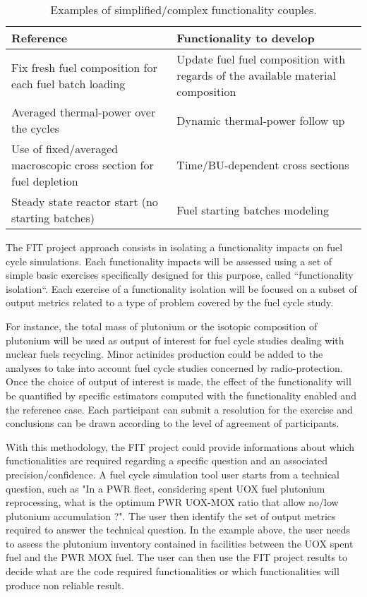 \begin{table}[h]
\centering
\begin{tabular}{ |p{}|p{}| }
  \hline
  Reference & Functionality to develop 
  \\ \hline
  Fix fresh fuel composition for each fuel batch loading 
  & Update fuel fuel composition with regards of the available material
  composition 
  \\ \hline
  Averaged thermal-power over the cycles 
  & Dynamic thermal-power follow up
  \\ \hline
  Use of fixed/averaged macroscopic cross section for fuel depletion
  & Time/\gls{BU}-dependent cross sections
  \\ \hline
  Steady state reactor start (no starting batches)
  & Fuel starting batches modeling \\
  \hline
\end{tabular}
\label{Tab:Funct}
\caption{Examples of simplified/complex functionality couples.}
\end{table}


The FIT project approach consists in isolating a functionality impacts on fuel
cycle simulations. Each functionality impacts will be assessed using a set of
simple basic exercises specifically designed for this purpose, called
``functionality isolation``. Each exercise of a functionality isolation will be
focused on a subset of output metrics related to a type of problem covered by
the fuel cycle study.  

For instance, the total mass of plutonium or the isotopic composition of
plutonium will be used as output of interest for fuel cycle studies dealing with 
nuclear fuels recycling. Minor actinides production could be added to the
analyses to take into account fuel cycle studies concerned by radio-protection.
Once the choice of output of interest is made, the effect of the functionality
will be quantified by specific estimators computed with the functionality
enabled and the reference case. Each participant can submit a resolution for the
exercise and conclusions can be drawn according to the level of agreement
of participants.

With this methodology, the FIT project could provide informations about which
functionalities are required regarding a specific question and an associated
precision/confidence.  A fuel cycle simulation tool user starts from a technical
question, such as "In a \gls{PWR} fleet, considering spent \gls{UOX} fuel plutonium
reprocessing, what is the optimum \gls{PWR} \gls{UOX}-\gls{MOX} ratio that allow no/low plutonium
accumulation ?". The user then identify the set of output metrics required to
answer the technical question. In the example above, the user needs to assess
the plutonium inventory contained in facilities between the \gls{UOX} spent fuel and
the \gls{PWR} \gls{MOX} fuel. The user can then use the FIT project results to decide what
are the code required functionalities or which functionalities will produce non
reliable result. 


